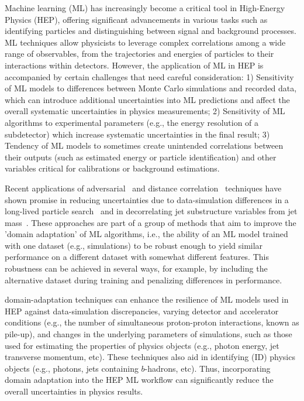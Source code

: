\documentclass[letter, USenglish, 11pt, subfigure]{article}
\begin{document}
Machine learning (ML) has increasingly become a critical tool in High-Energy Physics (HEP), offering significant advancements in various tasks such as identifying particles and distinguishing between signal and background processes. ML techniques allow physicists to leverage complex correlations among a wide range of observables, from the trajectories and energies of particles to their interactions within detectors. However, the application of ML in HEP is accompanied by certain challenges that need careful consideration: 1) Sensitivity of ML models to differences between Monte Carlo simulations and recorded data, which can introduce additional uncertainties into ML predictions and affect the overall systematic uncertainties in physics measurements; 2) Sensitivity of ML algorithms to experimental parameters (e.g., the energy resolution of a subdetector) which increase systematic uncertainties in the final result; 3) Tendency of ML models to sometimes create unintended correlations between their outputs (such as estimated energy or particle identification) and other variables critical for calibrations or background estimations.

Recent applications of adversarial~\cite{louppe2017learning} and distance correlation~\cite{PhysRevLett.125.122001} techniques have shown promise in reducing uncertainties due to data-simulation differences in a long-lived particle search~\cite{calRatio} and in decorrelating jet substructure variables from jet mass~\cite{ATL-PHYS-PUB-2018-014}. These approaches are part of a group of methods that aim to improve the 'domain adaptation' of ML algorithms, i.e., the ability of an ML model trained with one dataset (e.g., simulations) to be robust enough to yield similar performance on a different dataset with somewhat different features. This robustness can be achieved in several ways, for example, by including the alternative dataset during training and penalizing differences in performance.

domain-adaptation techniques can enhance the resilience of ML models used in HEP against data-simulation discrepancies, varying detector and accelerator conditions (e.g., the number of simultaneous proton-proton interactions, known as pile-up), and changes in the underlying parameters of simulations, such as those used for estimating the properties of physics objects (e.g., photon energy, jet transverse momentum, etc). These techniques also aid in identifying (ID) physics objects (e.g., photons, jets containing $b$-hadrons, etc). Thus, incorporating domain adaptation into the HEP ML workflow can significantly reduce the overall uncertainties in physics results.
\end{document}
